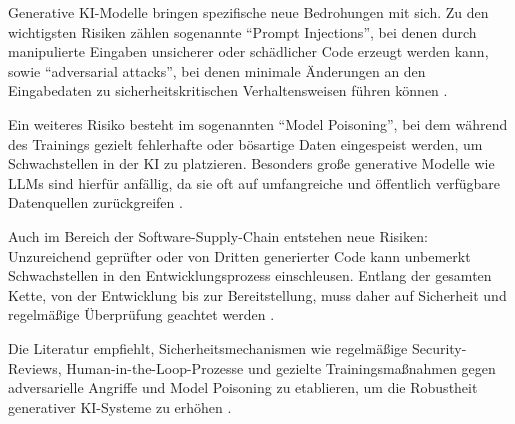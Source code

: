 
Generative KI-Modelle bringen spezifische neue Bedrohungen mit sich. Zu den
wichtigsten Risiken zählen sogenannte \enquote{Prompt Injections}, bei denen
durch manipulierte Eingaben unsicherer oder schädlicher Code erzeugt werden
kann, sowie \enquote{adversarial attacks}, bei denen minimale Änderungen an den
Eingabedaten zu sicherheitskritischen Verhaltensweisen führen können
\cite{shi_ai-assisted_2023}.

Ein weiteres Risiko besteht im sogenannten \enquote{Model Poisoning}, bei dem
während des Trainings gezielt fehlerhafte oder bösartige Daten eingespeist
werden, um Schwachstellen in der KI zu platzieren. Besonders große generative
Modelle wie LLMs sind hierfür anfällig, da sie oft auf umfangreiche und
öffentlich verfügbare Datenquellen zurückgreifen \cite{alwageed_role_nodate}.

Auch im Bereich der Software-Supply-Chain entstehen neue Risiken: Unzureichend
geprüfter oder von Dritten generierter Code kann unbemerkt Schwachstellen in
den Entwicklungsprozess einschleusen. Entlang der gesamten Kette, von der
Entwicklung bis zur Bereitstellung, muss daher auf Sicherheit und regelmäßige
Überprüfung geachtet werden \cite{siebert_generative_2024}.

Die Literatur empfiehlt, Sicherheitsmechanismen wie regelmäßige
Security-Reviews, Human-in-the-Loop-Prozesse und gezielte Trainingsmaßnahmen
gegen adversarielle Angriffe und Model Poisoning zu etablieren, um die
Robustheit generativer KI-Systeme zu erhöhen \cite{shi_ai-assisted_2023,
    alwageed_role_nodate, siebert_generative_2024}.
